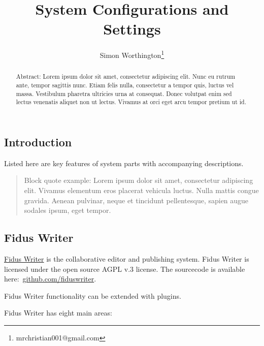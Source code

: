 \documentclass{article}
\author{Simon Worthington\thanks{mrchristian001@gmail.com}}
\affil{The Web}
\begin{document}
\title{System Configurations and Settings}

\maketitle

\begin{abstract}


Abstract: Lorem ipsum dolor sit amet, consectetur adipiscing elit. Nunc eu rutrum ante, tempor sagittis nunc. Etiam felis nulla, consectetur a tempor quis, luctus vel massa. Vestibulum pharetra ultricies urna at consequat. Donec volutpat enim sed lectus venenatis aliquet non ut lectus. Vivamus at orci eget arcu tempor pretium ut id.

\end{abstract}


\subsection{Introduction}\label{H9202894}



Listed here are key features of system parts with accompanying descriptions.

\begin{quote}



Block quote example: Lorem ipsum dolor sit amet, consectetur adipiscing elit. Vivamus elementum eros placerat vehicula luctus. Nulla mattis congue gravida. Aenean pulvinar, neque et tincidunt pellentesque, sapien augue sodales ipsum, eget tempor.


\end{quote}


\subsection{Fidus Writer}\label{H3154410}



\href{https://www.fiduswriter.org/}{Fidus Writer} is the collaborative editor and publishing system. Fidus Writer is licensed under the open source AGPL v.3 license. The sourcecode is available here: \href{http://github.com/fiduswriter}{github.com/fiduswriter}.


Fidus Writer functionality can be extended with plugins.


Fidus Writer has eight main areas:
\end{document}
